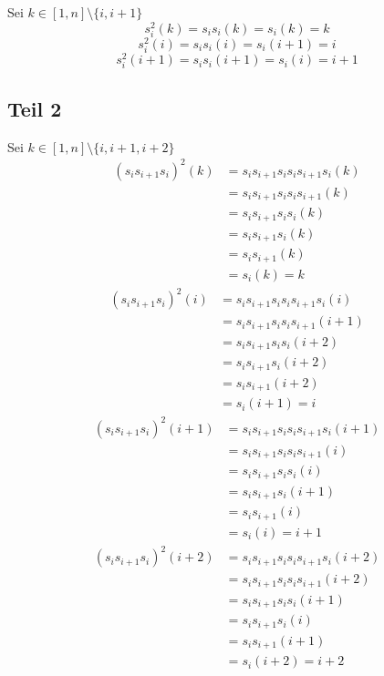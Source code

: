 \documentclass[10pt,a4paper]{article}
\begin{document}
Sei $k \in [1, n] \setminus \{i, i + 1\}$
\begin{equation}
s_{i}^{2}(k) = s_{i}s_{i}(k) = s_{i}(k) = k
\end{equation}
\begin{equation}
s_{i}^{2}(i) = s_{i}s_{i}(i) = s_{i}(i + 1) = i
\end{equation}
\begin{equation}
s_{i}^{2}(i + 1) = s_{i}s_{i}(i + 1) = s_{i}(i) = i + 1
\end{equation}

\subsection*{Teil 2}

Sei $k \in [1, n] \setminus \{i, i + 1, i + 2\}$
\begin{align*}
(s_{i}s_{i + 1}s_{i})^{2}(k) & = s_{i}s_{i + 1}s_{i}s_{i}s_{i + 1}s_{i}(k)\\
& = s_{i}s_{i + 1}s_{i}s_{i}s_{i + 1}(k)\\
& = s_{i}s_{i + 1}s_{i}s_{i}(k)\\
& = s_{i}s_{i + 1}s_{i}(k)\\
& = s_{i}s_{i + 1}(k)\\
& = s_{i}(k) = k
\end{align*}
\begin{align*}
(s_{i}s_{i + 1}s_{i})^{2}(i) & = s_{i}s_{i + 1}s_{i}s_{i}s_{i + 1}s_{i}(i)\\
& = s_{i}s_{i + 1}s_{i}s_{i}s_{i + 1}(i + 1)\\
& = s_{i}s_{i + 1}s_{i}s_{i}(i + 2)\\
& = s_{i}s_{i + 1}s_{i}(i + 2)\\
& = s_{i}s_{i + 1}(i + 2)\\
& = s_{i}(i + 1) = i
\end{align*}
\begin{align*}
(s_{i}s_{i + 1}s_{i})^{2}(i + 1) & = s_{i}s_{i + 1}s_{i}s_{i}s_{i + 1}s_{i}(i + 1)\\
& = s_{i}s_{i + 1}s_{i}s_{i}s_{i + 1}(i)\\
& = s_{i}s_{i + 1}s_{i}s_{i}(i)\\
& = s_{i}s_{i + 1}s_{i}(i + 1)\\
& = s_{i}s_{i + 1}(i)\\
& = s_{i}(i) = i + 1
\end{align*}
\begin{align*}
(s_{i}s_{i + 1}s_{i})^{2}(i + 2) & = s_{i}s_{i + 1}s_{i}s_{i}s_{i + 1}s_{i}(i + 2)\\
& = s_{i}s_{i + 1}s_{i}s_{i}s_{i + 1}(i + 2)\\
& = s_{i}s_{i + 1}s_{i}s_{i}(i + 1)\\
& = s_{i}s_{i + 1}s_{i}(i)\\
& = s_{i}s_{i + 1}(i + 1)\\
& = s_{i}(i + 2) = i + 2
\end{align*}
\end{document}
